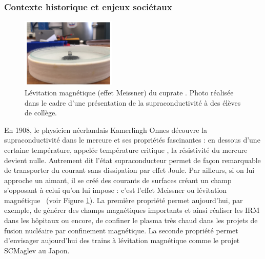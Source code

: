 \subsubsection{Contexte historique et enjeux sociétaux}
\begin{figure}
    \centering
      \includegraphics[width=0.4\textwidth]{Fig1.png} 
      \caption{Lévitation magnétique (effet Meissner) du cuprate . Photo réalisée dans le cadre d'une présentation de la supraconductivité à des élèves de collège. 
      }
      \label{fig:SC}
  \end{figure}
En 1908, le physicien néerlandais Kamerlingh Onnes découvre la supraconductivité dans le mercure et ses propriétés fascinantes : en dessous d'une certaine température, appelée \og température critique \fg , la résistivité du mercure devient nulle. Autrement dit l'état supraconducteur permet de façon remarquable de transporter du courant sans dissipation par effet Joule. Par ailleurs, si on lui approche un aimant, il se créé des courants de surfaces créant un champ s'opposant à celui qu'on lui impose : c'est l'effet Meissner ou \og lévitation magnétique \fg ~(voir Figure \ref{fig:SC}). La première propriété permet aujourd'hui, par exemple, de générer des champs magnétiques importants et ainsi réaliser les IRM dans les hôpitaux ou encore, de confiner le plasma très chaud dans les projets de fusion nucléaire par confinement magnétique. La seconde propriété permet d'envisager aujourd'hui des trains à lévitation magnétique comme le projet SCMaglev au Japon.\\

